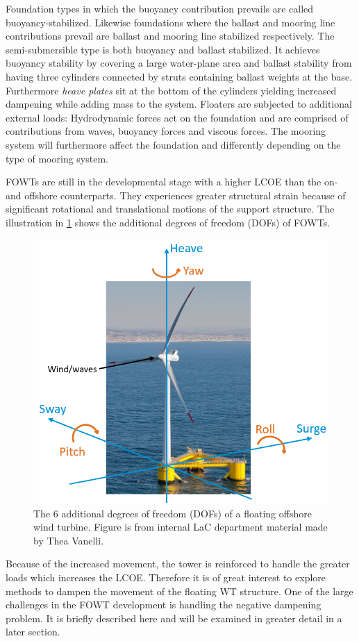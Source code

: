 Foundation types in which the buoyancy contribution prevails are called buoyancy-stabilized. Likewise foundations where the ballast and mooring line contributions prevail are ballast and mooring line stabilized respectively. The semi-submersible type is both buoyancy and ballast stabilized. It achieves buoyancy stability by covering a large water-plane area and ballast stability from having three cylinders connected by struts containing ballast weights at the base. Furthermore \textit{heave plates} sit at the bottom of the cylinders yielding increased dampening while adding mass to the system.
Floaters are subjected to additional external loads: Hydrodynamic forces act on the foundation and are comprised of contributions from waves, buoyancy forces and viscous forces. The mooring system will furthermore affect the foundation and differently depending on the type of mooring system.

\smallskip
FOWTs are still in the developmental stage with a higher LCOE than the on- and offshore counterparts. They experiences greater structural strain because of significant rotational and translational motions of the support structure. The illustration in \cref{fig:fowt_coordinates} shows the additional degrees of freedom (DOFs) of FOWTs.
\begin{figure}[ht]
	\centering
	\includegraphics[width=0.55\linewidth]{Graphics/FOWTcoordinates.png}
	\caption{The 6 additional degrees of freedom (DOFs) of a floating offshore wind turbine. Figure is from internal LaC department material made by Thea Vanelli.}
	\label{fig:fowt_coordinates}
\end{figure}
Because of the increased movement, the tower is reinforced to handle the greater loads which increases the LCOE. Therefore it is of great interest to explore methods to dampen the movement of the floating WT structure. One of the large challenges in the FOWT development is handling the negative dampening problem. It is briefly described here and will be examined in greater detail in a later section.

